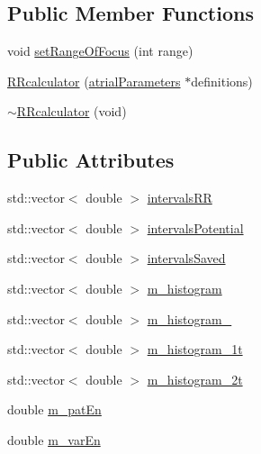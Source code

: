 \subsection*{Public Member Functions}
\begin{DoxyCompactItemize}
\item 
void \hyperlink{class_r_rcalculator_ac612758f699b103d8deedf130dbc8cc9}{set\+Range\+Of\+Focus} (int range)
\item 
\hyperlink{class_r_rcalculator_a1c8424d714a284daa7a87f634b4f8c1e}{R\+Rcalculator} (\hyperlink{classatrial_parameters}{atrial\+Parameters} $\ast$definitions)
\item 
\hyperlink{class_r_rcalculator_a8af8b7c5cb9fd55b78757780ba8c3007}{$\sim$\+R\+Rcalculator} (void)
\end{DoxyCompactItemize}
\subsection*{Public Attributes}
\begin{DoxyCompactItemize}
\item 
std\+::vector$<$ double $>$ \hyperlink{class_r_rcalculator_a9c99b0abb14ec0a15edb6516202f1670}{intervals\+R\+R}
\item 
std\+::vector$<$ double $>$ \hyperlink{class_r_rcalculator_abb337d30cfd2d443d7aa00e62f8d12a0}{intervals\+Potential}
\item 
std\+::vector$<$ double $>$ \hyperlink{class_r_rcalculator_accf15b47a0f368de9dd5a1d758dac8a8}{intervals\+Saved}
\item 
std\+::vector$<$ double $>$ \hyperlink{class_r_rcalculator_ad7f152f6ec71894388eca83acce27c82}{m\+\_\+histogram}
\item 
std\+::vector$<$ double $>$ \hyperlink{class_r_rcalculator_a1a62706d3af65ec918550715e4748666}{m\+\_\+histogram\+\_}
\item 
std\+::vector$<$ double $>$ \hyperlink{class_r_rcalculator_a88044253bb67963b690efe03b4566461}{m\+\_\+histogram\+\_\+1t}
\item 
std\+::vector$<$ double $>$ \hyperlink{class_r_rcalculator_a22fd8fedd28bf0b6455eb3a7ade48960}{m\+\_\+histogram\+\_\+2t}
\item 
double \hyperlink{class_r_rcalculator_ab2de224108c8ae0611b0a8b12cf9ce1f}{m\+\_\+pat\+En}
\item 
double \hyperlink{class_r_rcalculator_a94f0e6781def8bd5e38124e3144d3acc}{m\+\_\+var\+En}
\end{DoxyCompactItemize}



